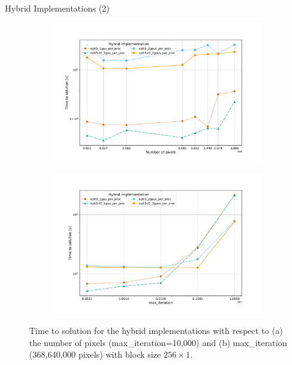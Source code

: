 \documentclass[10pt]{beamer}
\begin{document}
\begin{frame}{Hybrid Implementations (2)}
	
	\begin{figure}
		\begin{subfigure}{.6\textwidth}
			\centering
			\hspace{-2cm}
			\includegraphics[width=.98\linewidth, clip, trim={1.5cm 1cm 2.5cm 2cm}]{hybrid-optis-px.pdf}
			\caption{} 
			\label{fig:hybrid-optis-px}
		\end{subfigure}%
		\begin{subfigure}{.6\textwidth}
			\centering
			\hspace{-2.5cm}
			\includegraphics[width=.98\linewidth, clip, trim={1.5cm 1cm 2.5cm 2cm}]{hybrid-optis-maxiter.pdf}
			\caption{} 
			\label{fig:hybrid-optis-maxiter}
		\end{subfigure}
		\vspace{-0.4cm}
		\caption{Time to solution for the hybrid implementations with respect to (a) the number of pixels (max\_iteration=10,000) and (b) max\_iteration (368,640,000 pixels) with block size $256\times1$.}
		\label{fig:hybrid-optis}
	\end{figure}
	
\end{frame}
\end{document}
